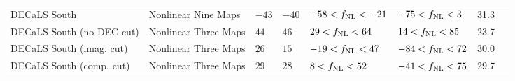 \begin{table}
{\begin{tabular}{llllllll}
DECaLS South              & Nonlinear Nine Maps& $   -43$& $   -40$& $   -58<f_{\rm NL}<   -21$& $   -75<f_{\rm NL}<     3$ &   31.3\\
DECaLS South (no DEC cut) & Nonlinear Three Maps& $    44$& $    46$& $    29<f_{\rm NL}<    64$& $    14<f_{\rm NL}<    85$ &   23.7\\
DECaLS South (imag. cut)  & Nonlinear Three Maps& $    26$& $    15$& $   -19<f_{\rm NL}<    47$& $   -84<f_{\rm NL}<    72$ &   30.0\\
DECaLS South (comp. cut)  & Nonlinear Three Maps& $    29$& $    28$& $     8<f_{\rm NL}<    52$& $   -41<f_{\rm NL}<    75$ &   29.7\\
   \hline
    \end{tabular}}
\end{table}





